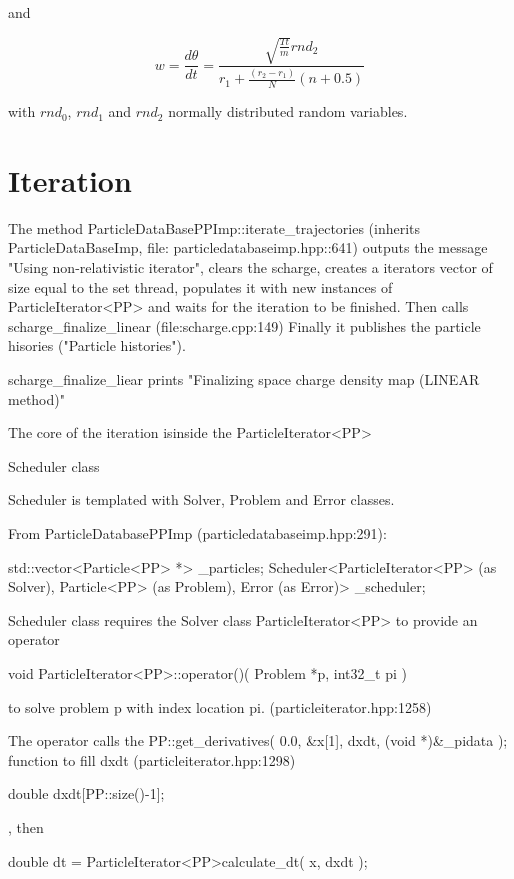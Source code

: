 \documentclass[12pt,a4paper]{article}
\begin{document}
and

\begin{equation}
	w=\frac{d\theta}{dt}=\frac{\sqrt{\frac{Tt}{m}}rnd_{2}}{r_{1} + \frac{(r_{2}-r_{1})}{N}(n+0.5)}
\end{equation}

with $rnd_{0}$, $rnd_{1}$ and $rnd_{2}$ normally distributed random variables.


\section{Iteration}

The method ParticleDataBasePPImp::iterate\_trajectories (inherits ParticleDataBaseImp, file: particledatabaseimp.hpp::641) outputs the message "Using non-relativistic iterator", clears the scharge, creates a iterators vector of size equal to the set thread, populates it with new instances of ParticleIterator<PP> and waits for the iteration to be finished. Then calls scharge\_finalize\_linear (file:scharge.cpp:149) Finally it publishes the particle hisories ("Particle histories").

scharge\_finalize\_liear prints "Finalizing space charge density map (LINEAR method)"

The core of the iteration isinside the ParticleIterator<PP>


Scheduler class 

Scheduler is templated with Solver, Problem and Error classes. 

From ParticleDatabasePPImp (particledatabaseimp.hpp:291):

std::vector<Particle<PP> *>                        _particles;
Scheduler<ParticleIterator<PP> (as Solver), Particle<PP> (as Problem), Error (as Error)> _scheduler;



Scheduler class requires the Solver class ParticleIterator<PP> to provide an operator

  void ParticleIterator<PP>::operator()( Problem *p, int32_t pi )
  
to solve problem p with index location pi. (particleiterator.hpp:1258)

The operator calls the PP::get_derivatives( 0.0, &x[1], dxdt, (void *)&_pidata ); function to 
fill dxdt (particleiterator.hpp:1298)

double dxdt[PP::size()-1];

, then 

double dt = ParticleIterator<PP>calculate_dt( x, dxdt );
\end{document}
